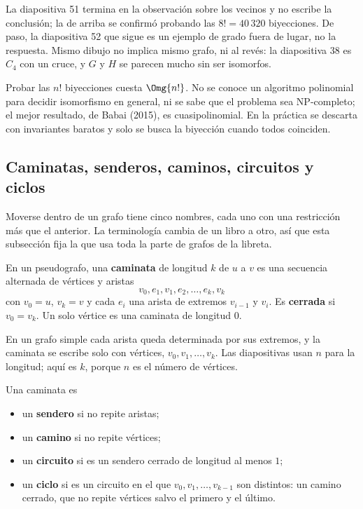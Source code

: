 \documentclass[11pt,letterpaper]{article}
\begin{document}
\begin{ojo}
  La diapositiva 51 termina en la observación sobre los vecinos y no
  escribe la conclusión; la de arriba se confirmó probando las
  $8! = 40\,320$ biyecciones. De paso, la diapositiva 52 que sigue es
  un ejemplo de grado fuera de lugar, no la respuesta. Mismo dibujo no
  implica mismo grafo, ni al revés: la diapositiva 38 es $C_4$ con un
  cruce, y $G$ y $H$ se parecen mucho sin ser isomorfos.
\end{ojo}

Probar las $n!$ biyecciones cuesta $\Omg{n!}$. No se conoce un
algoritmo polinomial para decidir isomorfismo en general, ni se sabe
que el problema sea NP-completo; el mejor resultado, de Babai (2015),
es cuasipolinomial. En la práctica se descarta con invariantes baratos
y solo se busca la biyección cuando todos coinciden.


\subsection*{Caminatas, senderos, caminos, circuitos y ciclos}

Moverse dentro de un grafo tiene cinco nombres, cada uno con una
restricción más que el anterior. La terminología cambia de un libro a
otro, así que esta subsección fija la que usa toda la parte de grafos
de la libreta.

\begin{definicion}[Caminata]
  \label{def:caminata}
  En un pseudografo, una \textbf{caminata} de longitud $k$ de $u$ a $v$
  es una secuencia alternada de vértices y aristas
  \[
    v_0, e_1, v_1, e_2, \dots, e_k, v_k
  \]
  con $v_0 = u$, $v_k = v$ y cada $e_i$ una arista de extremos
  $v_{i-1}$ y $v_i$. Es \textbf{cerrada} si $v_0 = v_k$. Un solo
  vértice es una caminata de longitud $0$.
\end{definicion}

En un grafo simple cada arista queda determinada por sus extremos, y
la caminata se escribe solo con vértices, $v_0, v_1, \dots, v_k$. Las
diapositivas usan $n$ para la longitud; aquí es $k$, porque $n$ es el
número de vértices.

\begin{definicion}
  \label{def:sendero-ciclo}
  Una caminata es
  \begin{itemize}[itemsep=0.1em]
    \item un \textbf{sendero} si no repite aristas;
    \item un \textbf{camino} si no repite vértices;
    \item un \textbf{circuito} si es un sendero cerrado de longitud al
          menos $1$;
    \item un \textbf{ciclo} si es un circuito en el que
          $v_0, v_1, \dots, v_{k-1}$ son distintos: un camino cerrado,
          que no repite vértices salvo el primero y el último.
  \end{itemize}
\end{definicion}
\end{document}
